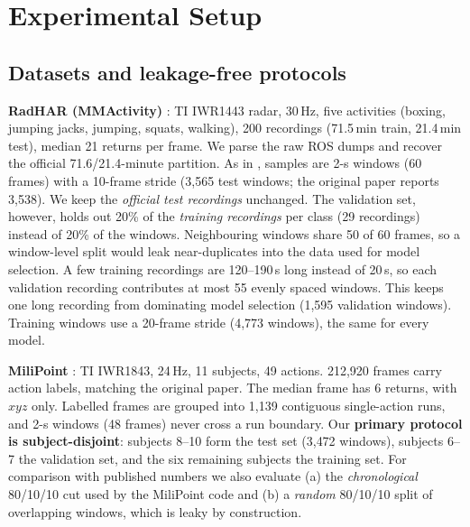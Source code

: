 \section{Experimental Setup}
\label{sec:setup}

\subsection{Datasets and leakage-free protocols}
\label{sec:data}
\textbf{RadHAR (MMActivity)} \cite{singh2019radhar}: TI IWR1443 radar, 30\,Hz,
five activities (boxing, jumping jacks, jumping, squats, walking), 200
recordings (71.5\,min train, 21.4\,min test), median 21 returns per frame. We
parse the raw ROS dumps and recover the official 71.6/21.4-minute partition. As
in \cite{singh2019radhar}, samples are 2-s windows (60 frames) with a 10-frame
stride (3{,}565 test windows; the original paper reports 3{,}538). We keep the
\emph{official test recordings} unchanged. The validation set, however, holds
out 20\% of the \emph{training recordings} per class (29 recordings) instead of
20\% of the windows. Neighbouring windows share 50 of 60 frames, so a
window-level split would leak near-duplicates into the data used for model
selection. A few training recordings are 120--190\,s long instead of 20\,s, so
each validation recording contributes at most 55 evenly spaced windows. This
keeps one long recording from dominating model selection (1{,}595 validation
windows). Training windows use a 20-frame stride (4{,}773 windows), the same
for every model.

\textbf{MiliPoint} \cite{cui2023milipoint}: TI IWR1843, 24\,Hz, 11 subjects, 49
actions. 212{,}920 frames carry action labels, matching the original paper. The
median frame has 6 returns, with $xyz$ only. Labelled frames are grouped into
1{,}139 contiguous single-action runs, and 2-s windows (48 frames) never cross a
run boundary. Our \textbf{primary protocol is subject-disjoint}: subjects 8--10
form the test set (3{,}472 windows), subjects 6--7 the validation set, and the six
remaining subjects the training set. For comparison with published numbers we
also evaluate (a) the \emph{chronological} 80/10/10 cut used by the MiliPoint
code and (b) a \emph{random} 80/10/10 split of overlapping windows, which is
leaky by construction.

